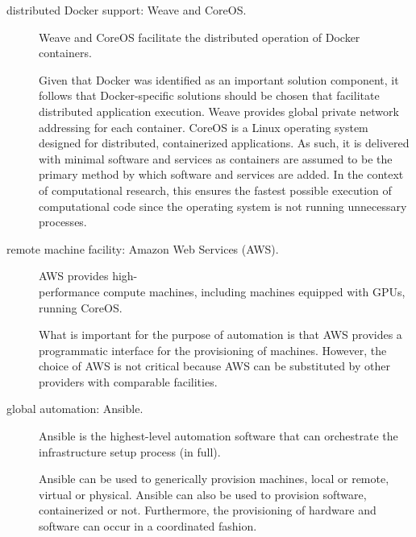 \begin{description}
\item[distributed \textsf{Docker} support: \textsf{Weave} and \textsf{CoreOS}.]
%
\textsf{Weave} and \textsf{CoreOS} facilitate the distributed operation of \textsf{Docker} containers.

Given that \textsf{Docker} was identified as an important solution component, it follows that \textsf{Docker}-specific solutions should be chosen that facilitate distributed application execution.
%
\textsf{Weave} provides global private network addressing for each container.
%
\textsf{CoreOS} is a \textsf{Linux} operating system designed for distributed, containerized applications.
%
As such, it is delivered with minimal software and services as containers are assumed to be the primary method by which software and services are added.
%
In the context of computational research, this ensures the fastest possible execution of computational code since the operating system is not running unnecessary processes.


\item[remote machine facility: \textsf{Amazon Web Services (AWS)}.] 
  \textsf{AWS} provides high-\\performance compute machines, including machines equipped with GPUs, running \textsf{CoreOS}.
  

  What is important for the purpose of automation is that \textsf{AWS} provides a programmatic interface for the provisioning of machines.
  However, the choice of \textsf{AWS} is not critical because \textsf{AWS} can be substituted by other providers with comparable facilities.
 


\item[global automation: \textsf{Ansible}.]
  \textsf{Ansible} is the highest-level automation software that can orchestrate the infrastructure setup process (in full).
  
  \textsf{Ansible} can be used to generically provision machines, local or remote, virtual or physical.
  \textsf{Ansible} can also be used to provision software, containerized or not.
  Furthermore, the provisioning of hardware and software can occur in a coordinated fashion.



\end{description}


